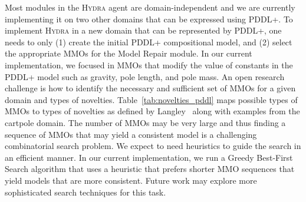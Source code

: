 \documentclass[letterpaper]{article} %
\newcommand{\sbirds}{Science Birds\xspace} %
\newcommand{\hydra}{\textsc{Hydra}\xspace} %
\begin{document}
Most modules in the \hydra agent are domain-independent and we are currently implementing it on two other domains that can be expressed using PDDL+. 
To implement \hydra in a new domain that can be represented by PDDL+, one needs to only (1) create the initial PDDL+ compositional model, and (2) select the appropriate MMOs for the Model Repair module.
In our current implementation, we focused in MMOs that modify the value of constants in the PDDL+ model such as gravity, pole length, and pole mass. 
An open research challenge is how to identify the necessary and sufficient set of MMOs for a given domain and types of novelties. 
Table~\ref{tab:novelties_pddl} maps possible types of MMOs to types of novelties as defined by Langley~\cite{langley2020open} along with examples from the cartpole domain. 
The number of MMOs may be very large and thus finding a sequence of MMOs that may yield a consistent model is a challenging combinatorial search problem.  We expect to need heuristics to guide the search in an efficient manner. 
In our current implementation, we run a Greedy Best-First Search algorithm that uses a heuristic that prefers shorter MMO sequences that yield models that are more consistent. Future work may explore more sophisticated search techniques for this task. %
\end{document}
